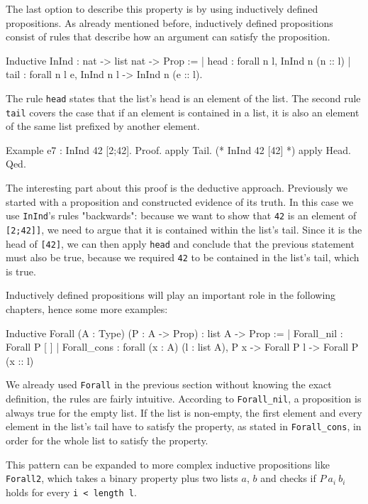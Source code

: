 \documentclass[paper = a4, fleqn, abstract=on, twoside]{scrreprt}
\newcommand{\coqinline}[1]{\texttt{#1}}
\begin{document}
\par \noindent
The last option to describe this property is by using inductively defined propositions. As already mentioned before, inductively defined propositions consist of rules that describe how an argument can satisfy the proposition.
\label{In}
\begin{coqcode}
Inductive InInd : nat -> list nat -> Prop :=
  | head : forall n l, InInd n (n :: l)
  | tail : forall n l e, InInd n l -> InInd n (e :: l).
\end{coqcode} 
The rule \coqinline{head} states that the list's head is an element of the list. The second rule \coqinline{tail} covers the case that if an element is contained in a list, it is also an element of the same list prefixed by another element.
\begin{coqcode}
Example e7 : InInd 42 [2;42].
Proof. 
  apply Tail.  (* InInd 42 [42] *)
  apply Head.
Qed.           
\end{coqcode}
The interesting part about this proof is the deductive approach. Previously we started with a proposition and constructed evidence of its truth. In this case we use \coqinline{InInd}'s rules "backwards": because we want to show that \coqinline{42} is an element of \coqinline{[2;42]]}, we need to argue that it is contained within the list's tail. Since it is the head of \coqinline{[42]}, we can then apply \coqinline{head} and conclude that the previous statement must also be true, because we required \coqinline{42} to be contained in the list's tail, which is true.
\par
Inductively defined propositions will play an important role in the following chapters, hence some more examples:
\begin{coqcode}
Inductive Forall (A : Type) (P : A -> Prop) : list A -> Prop :=
  | Forall_nil : Forall P [ ]
  | Forall_cons : forall (x : A) (l : list A), P x -> Forall P l ->
                    Forall P (x :: l)
\end{coqcode}
We already used \coqinline{Forall} in the previous section without knowing the exact definition, the rules are fairly intuitive. According to \coqinline{Forall_nil}, a proposition is always true for the empty list. If the list is non-empty, the first element and every element in the list's tail have to satisfy the property, as stated in \coqinline{Forall_cons}, in order for the whole list to satisfy the property.
\par
This pattern can be expanded to more complex inductive propositions like \coqinline{Forall2}, which takes a binary property plus two lists $a$, $b$ and checks if $P ~ a_{i} ~ b_{i}$ holds for every \coqinline{i < length l}.
\end{document}
